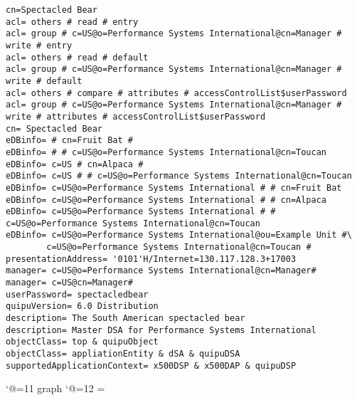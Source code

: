 
\tiny
\begin{verbatim}
cn=Spectacled Bear
acl= others # read # entry
acl= group # c=US@o=Performance Systems International@cn=Manager # write # entry
acl= others # read # default
acl= group # c=US@o=Performance Systems International@cn=Manager # write # default
acl= others # compare # attributes # accessControlList$userPassword
acl= group # c=US@o=Performance Systems International@cn=Manager # write # attributes # accessControlList$userPassword
cn= Spectacled Bear
eDBinfo= # cn=Fruit Bat # 
eDBinfo= # # c=US@o=Performance Systems International@cn=Toucan
eDBinfo= c=US # cn=Alpaca # 
eDBinfo= c=US # # c=US@o=Performance Systems International@cn=Toucan
eDBinfo= c=US@o=Performance Systems International # # cn=Fruit Bat 
eDBinfo= c=US@o=Performance Systems International # # cn=Alpaca
eDBinfo= c=US@o=Performance Systems International # # c=US@o=Performance Systems International@cn=Toucan
eDBinfo= c=US@o=Performance Systems International@ou=Example Unit #\
		c=US@o=Performance Systems International@cn=Toucan #
presentationAddress= '0101'H/Internet=130.117.128.3+17003
manager= c=US@o=Performance Systems International@cn=Manager#
manager= c=US@cn=Manager#
userPassword= spectacledbear
quipuVersion= 6.0 Distribution
description= The South American spectacled bear 
description= Master DSA for Performance Systems International
objectClass= top & quipuObject
objectClass= appliationEntity & dSA & quipuDSA
supportedApplicationContext= x500DSP & x500DAP & quipuDSP

\end{verbatim}

\catcode`@=11
\expandafter\ifx\csname graph\endcsname\relax {}\box\chardef\insc@unt\graph\fi
\catcode`@=12
\setbox\graph=\empty
